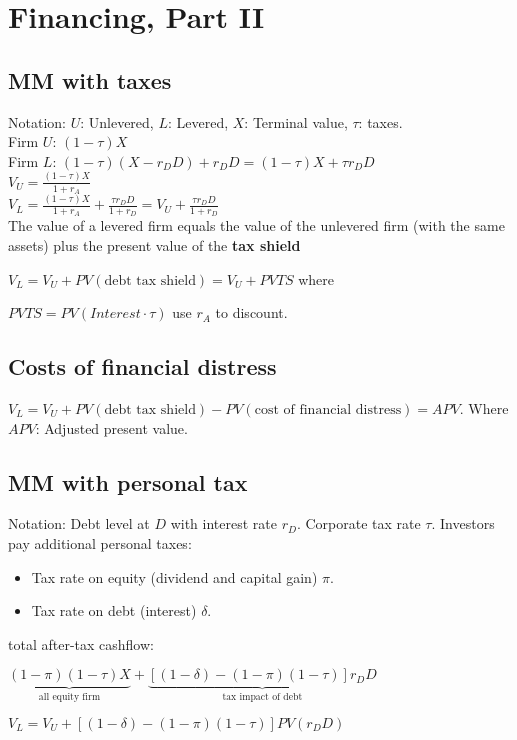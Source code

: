 \section{Financing, Part II}

\subsection*{MM with taxes}

Notation: $U$: Unlevered, $L$: Levered, 
 $X$: Terminal value, $\tau$: taxes. \\
Firm $U$: $(1-\tau)X$ \\
Firm $L$: $(1-\tau)(X-r_D D) + r_D D = (1-\tau)X + \tau r_D D $ \\
$V_U =\frac{(1-\tau)X}{1+r_A} $ \\
$V_L =\frac{(1-\tau)X}{1+r_A} + \frac{\tau r_D D}{1+r_D} = V_U + \frac{\tau r_D D}{1+r_D}  $ \\


The value of a levered firm equals the value of the unlevered
firm (with the same assets) plus the present value of the {\bf tax shield}

$V_L = V_U + PV(\text{debt tax shield}) = V_U + PVTS$ where 

$PVTS = PV(Interest \cdot \tau)$ use $r_A$ to discount.

\subsection*{Costs of financial distress }

$V_L = V_U + PV(\text{debt tax shield}) - PV (\text{cost of financial distress}) = APV$. Where $APV$: Adjusted present value.

\subsection*{MM with personal tax}

Notation: Debt level at $D$ with interest rate $r_D$.
Corporate tax rate $\tau$. Investors pay additional personal taxes:
\begin{itemize}
	\item Tax rate on equity (dividend and capital gain) $\pi$.
	\item Tax rate on debt (interest) $\delta$.
\end{itemize}

total after-tax cashflow:

$\underbrace{(1-\pi)(1-\tau)X}_{\text{all equity firm}} + \underbrace{[(1-\delta)-(1-\pi)(1-\tau)]r_DD}_{\text{tax impact of debt}}$

$V_L = V_U + [(1-\delta)-(1-\pi)(1-\tau)]PV(r_DD) $